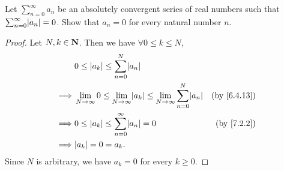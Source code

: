 \begin{exercise}\label{ex 7.3.3}
  Let \(\sum_{n = 0}^\infty a_n\) be an absolutely convergent series of real numbers such that \(\sum_{n = 0}^\infty \abs{a_n} = 0\).
  Show that \(a_n = 0\) for every natural number \(n\).
\end{exercise}

\begin{proof}
  Let \(N, k \in \mathbf{N}\).
  Then we have \(\forall 0 \leq k \leq N\),
  \begin{align*}
             & 0 \leq \abs{a_k} \leq \sum_{n = 0}^N \abs{a_n}                                                                                         \\
    \implies & \lim_{N \to \infty} 0 \leq \lim_{N \to \infty} \abs{a_k} \leq \lim_{N \to \infty} \sum_{n = 0}^N \abs{a_n} & \text{(by \cref{6.4.13})} \\
    \implies & 0 \leq \abs{a_k} \leq \sum_{n = 0}^\infty \abs{a_n} = 0                                                    & \text{(by \cref{7.2.2})}  \\
    \implies & \abs{a_k} = 0 = a_k.
  \end{align*}
  Since \(N\) is arbitrary, we have \(a_k = 0\) for every \(k \geq 0\).
\end{proof}